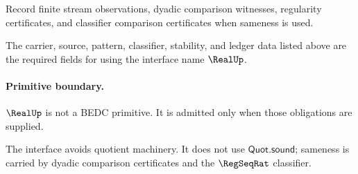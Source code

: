 \begin{definition}
\label{def:real-ledger-policy}
Record finite stream observations, dyadic comparison witnesses, regularity certificates, and classifier comparison certificates when sameness is used.
\end{definition}

\begin{definition}
\label{def:real-certificate-obligations}
The carrier, source, pattern, classifier, stability, and ledger data listed above are the required fields for using the interface name $\RealUp$.
\end{definition}

\paragraph{Primitive boundary.}
$\RealUp$ is not a BEDC primitive. It is admitted only when those obligations are supplied.

\begin{remark}
\label{rem:real-zero-axiom-note}
The interface avoids quotient machinery. It does not use $\mathsf{Quot.sound}$; sameness is carried by dyadic comparison certificates and the $\RegSeqRat$ classifier.
\end{remark}

